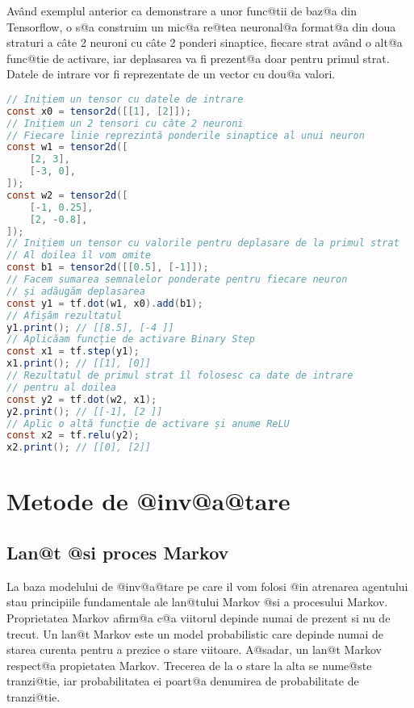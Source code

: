 Av\^ and exemplul anterior ca demonstrare a unor func@tii de baz@a din Tensorflow, o s@a construim un mic@a re@tea neuronal@a format@a din doua straturi a c\^ ate 2 neuroni cu c\^ ate 2 ponderi sinaptice, fiecare strat av\^ and o alt@a func@tie de activare, iar deplasarea va fi prezent@a doar pentru primul strat. Datele de intrare vor fi reprezentate de un vector cu dou@a valori.

\begin{lstlisting}[language=Java, caption=Exemple de folosire a bibliotecii Tensorflow, label={lst:exemple-tensor-nn}]
// Inițiem un tensor cu datele de intrare
const x0 = tensor2d([[1], [2]]);
// Inițiem un 2 tensori cu câte 2 neuroni
// Fiecare linie reprezintă ponderile sinaptice al unui neuron
const w1 = tensor2d([
    [2, 3],
    [-3, 0],
]);
const w2 = tensor2d([
    [-1, 0.25],
    [2, -0.8],
]);
// Inițiem un tensor cu valorile pentru deplasare de la primul strat
// Al doilea îl vom omite
const b1 = tensor2d([[0.5], [-1]]);
// Facem sumarea semnalelor ponderate pentru fiecare neuron
// și adăugăm deplasarea
const y1 = tf.dot(w1, x0).add(b1);
// Afișăm rezultatul
y1.print(); // [[8.5], [-4 ]]
// Aplicăam funcție de activare Binary Step
const x1 = tf.step(y1);
x1.print(); // [[1], [0]]
// Rezultatul de primul strat îl folosesc ca date de intrare
// pentru al doilea
const y2 = tf.dot(w2, x1);
y2.print(); // [[-1], [2 ]]
// Aplic o altă funcție de activare și anume ReLU
const x2 = tf.relu(y2);
x2.print(); // [[0], [2]]
\end{lstlisting}

\chapter{Metode de @inv@a@tare}

\section{Lan@t @si proces Markov}


La baza modelului de @inv@a@tare pe care il vom folosi @in atrenarea agentului stau principiile fundamentale ale lan@tului Markov @si a procesului Markov.
Proprietatea Markov afirm@a c@a viitorul depinde numai de prezent si nu de trecut. Un lan@t Markov este un model probabilistic care depinde numai de starea curenta pentru a prezice o stare viitoare. A@sadar, un lan@t Markov respect@a propietatea Markov.
Trecerea de la o stare la alta se nume@ste tranzi@tie, iar probabilitatea ei poart@a denumirea de probabilitate de tranzi@tie.


